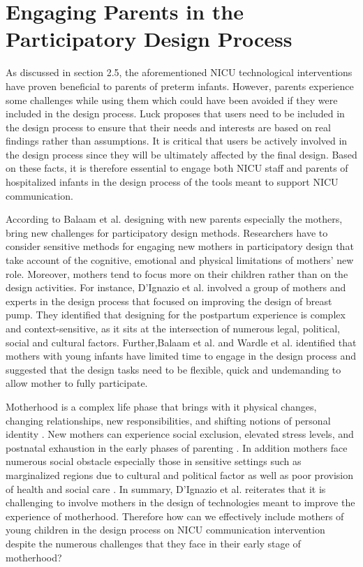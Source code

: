 \section{Engaging Parents in the Participatory Design Process}
As discussed in section 2.5, the aforementioned NICU technological interventions have proven beneficial to parents of preterm infants. However, parents experience some challenges while using them which could have been avoided if they were included in the design process. Luck \citep{Luck2018} proposes that users need to be included in the design process to ensure that their needs and interests are based on real findings rather than assumptions. It is critical that users be actively involved in the design process since they will be ultimately affected by the final design. Based on these facts, it is therefore essential to engage both NICU staff and parents of hospitalized infants in the design  process of the tools meant to support NICU communication. 

According to Balaam et al. \citep{Balaam2013} designing with new parents especially the mothers, bring new challenges for participatory design methods. Researchers have to consider sensitive methods for engaging new mothers in participatory design that take account of the cognitive, emotional and physical limitations of mothers' new role. Moreover, mothers tend to focus more on their children rather than on the design activities.  For instance, D'Ignazio et al. \citep{Ignazio2016} involved a group of mothers and experts in the design process that focused on improving the design of breast pump. They identified that designing for the postpartum experience is complex and context-sensitive, as it sits at the intersection of numerous legal, political, social and cultural factors. Further,Balaam et al. \citep{Balaam2015} and Wardle et al. \citep{Wardle2018a} identified that mothers with young infants have limited time to engage in the design process and suggested that the design tasks need to be flexible, quick and undemanding to allow mother to fully participate.

 Motherhood is a complex life phase that brings with it physical changes, changing relationships, new responsibilities, and shifting notions of personal identity \citep{Gibson2013}. New mothers can experience social exclusion, elevated stress levels, and postnatal exhaustion in the early phases of parenting  \citep{Ignazio2016, Gibson2013}. In addition mothers face numerous social obstacle especially those in sensitive settings such as marginalized regions due to cultural and political factor as well as poor provision of health and social care \citep{Goodburn2015,Hardee2012}. In summary, D'Ignazio et al. \citep{Ignazio2016} reiterates that it is challenging to involve mothers in the design of technologies meant to improve the experience of motherhood. Therefore how can we effectively include mothers of young children in the design process on NICU communication intervention despite the numerous challenges that they face in their early stage of motherhood?

